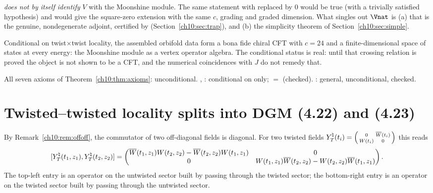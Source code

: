 \begin{warning}
 \emph{does not by itself identify} $V$ with the Moonshine module.  The
same statement with  replaced by $0$ would be true (with a trivially satisfied
hypothesis) and would give the square-zero extension with the same $c$, grading and graded
dimension.  What singles out $\Vnat$ is (a) that  is the genuine, nondegenerate adjoint,
certified by  (Section~\ref{ch10:sec:trap}), and (b) the simplicity theorem
of Section~\ref{ch10:sec:simple}.
\end{warning}

\begin{physics}
Conditional on twist$\times$twist locality, the assembled orbifold data form a bona fide chiral CFT with $c=24$ and a finite-dimensional space of states at every energy: the Moonshine module as a vertex operator algebra. The conditional status is real: until that crossing relation is proved the object is not shown to be a CFT, and the numerical coincidences with $J$ do not remedy that.
\end{physics}

\begin{status}
All seven axioms of Theorem~\ref{ch10:thm:axioms}: unconditional.  ,
: conditional on  only;  $=$
 (checked).  : general,
unconditional, checked.
\end{status}

\section{Twisted--twisted locality splits into DGM (4.22) and (4.23)}\label{ch10:sec:split}

By Remark~\ref{ch10:rem:offoff}, the commutator of two off-diagonal fields is diagonal.  For
two twisted fields
$Y^\natural_T(t_i)=\begin{psmallmatrix}0&\overline{W}(t_i)\\W(t_i)&0\end{psmallmatrix}$ this reads
\begin{equation}\label{ch10:eq:ttbracket}
 [Y^\natural_T(t_1,z_1),Y^\natural_T(t_2,z_2)]=
 \begin{pmatrix}
 \overline{W}(t_1,z_1)W(t_2,z_2)-\overline{W}(t_2,z_2)W(t_1,z_1) & 0\\
 0 & W(t_1,z_1)\overline{W}(t_2,z_2)-W(t_2,z_2)\overline{W}(t_1,z_1)
 \end{pmatrix}.
\end{equation}
The top-left entry is an operator on the untwisted sector built by passing through the twisted
sector; the bottom-right entry is an operator on the twisted sector built by passing through the
untwisted sector.

